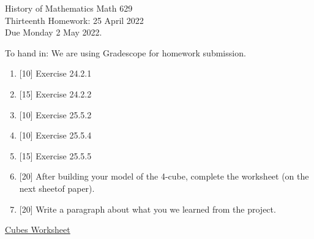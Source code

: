 \documentclass[12pt]{article}
\begin{document}
\LARGE 
\noindent
{\color{Maroon}History of Mathematics \hfill Math 629}\vspace{2pt}\\
\large
Thirteenth Homework: \hfill 25 April 2022\\
Due Monday 2 May 2022.
\normalsize\vspace{10pt}

To hand in: We are using Gradescope for homework submission.

\begin{enumerate}


\item  {[10]}  Exercise 24.2.1
    
\item  {[15]}  Exercise 24.2.2
    
\item  {[10]}  Exercise 25.5.2
    
\item  {[10]}  Exercise 25.5.4
    
\item  {[15]}  Exercise 25.5.5

\item {[20]} After building your model of the 4-cube, complete the worksheet (on the next sheetof paper).

\item {[20]} Write a paragraph about what you we learned from the project. 
  
\end{enumerate}

\newpage


\begin{center}
{\color{Maroon}\underline{{\Large\sf Cubes Worksheet}}}
\end{center}
\end{document}
